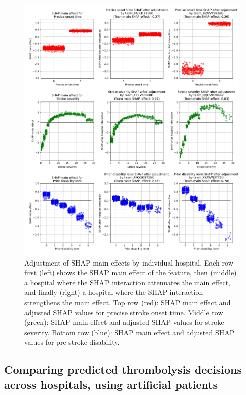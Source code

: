 \begin{figure}[!h]
\centering
\includegraphics[width=1.0\textwidth]{./images/12aa_three_way_shap_adjustment}
\caption{Adjustment of SHAP main effects by individual hospital. Each row first (left) shows the SHAP main effect of the feature, then (middle) a hospital where the SHAP interaction attenuates the main effect, and finally (right) a hospital where the SHAP interaction strengthens the main effect. Top row (red): SHAP main effect and adjusted SHAP values for precise stroke onset time. Middle row (green): SHAP main effect and adjusted SHAP values for stroke severity. Bottom row (blue): SHAP main effect and adjusted SHAP values for pre-stroke disability.}
\label{fig:results_shap_hosp_intercations}
\end{figure}

\subsection{Comparing predicted thrombolysis decisions across hospitals, using artificial patients}

